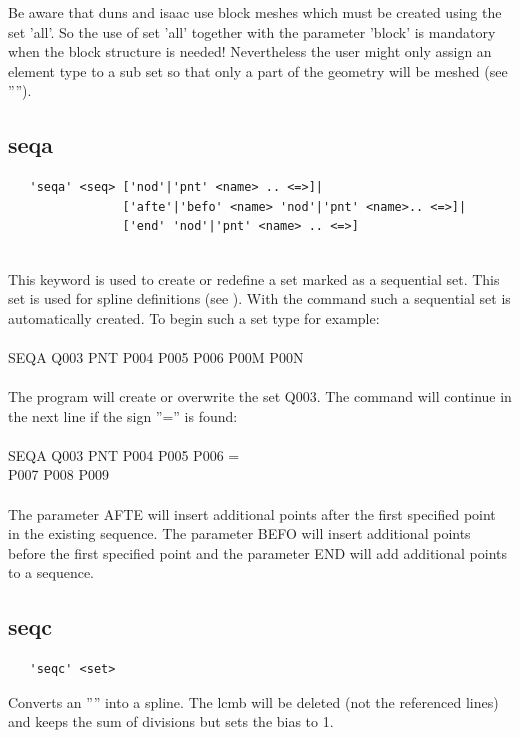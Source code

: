 \documentclass{article}
\begin{document}
Be aware that duns and isaac use block meshes which must be created using the set 'all'. So the use of set 'all' together with the parameter 'block' is mandatory when the block structure is needed! Nevertheless the user might only assign an element type to a sub set so that only a part of the geometry will be meshed (see '''').


\subsection{\label{seqa}seqa}
\begin{verbatim}
   'seqa' <seq> ['nod'|'pnt' <name> .. <=>]|
                ['afte'|'befo' <name> 'nod'|'pnt' <name>.. <=>]|
                ['end' 'nod'|'pnt' <name> .. <=>]
                 
\end{verbatim}
This keyword is used to create or redefine a set marked as a sequential set. This set is used for spline definitions (see ). With the command  such a sequential set is automatically created. To begin such a set type for example:\\\\SEQA  Q003     PNT  P004 P005 P006 P00M P00N\\\\The program will create or overwrite the set Q003. The command will continue in the next line if the sign ''='' is found:\\\\SEQA  Q003     PNT  P004 P005 P006 =\\                    P007 P008 P009\\\\The parameter AFTE will insert additional points after the first specified point in the existing sequence. The parameter BEFO will insert additional points before the first specified point and the parameter END will add additional points to a sequence.

\subsection{\label{seqc}seqc}
\begin{verbatim}
   'seqc' <set>
\end{verbatim}
Converts an '''' into a spline. The lcmb will be deleted (not the referenced lines) and keeps the sum of divisions but sets the bias to 1.
\end{document}
